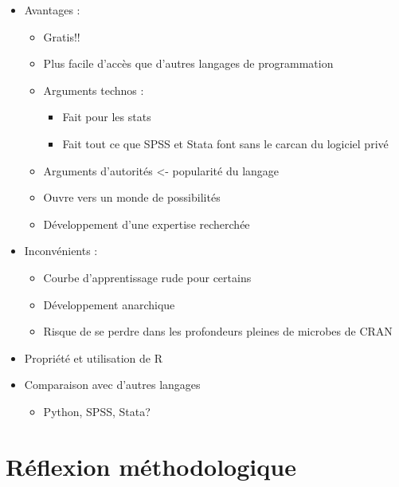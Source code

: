 \documentclass[
  letterpaper,
  DIV=11,
  numbers=noendperiod]{scrreprt}
\providecommand{\tightlist}{%
  \setlength{\itemsep}{0pt}\setlength{\parskip}{0pt}}\usepackage{longtable,booktabs,array}
\begin{document}
\begin{itemize}
\tightlist
\item
  Avantages :

  \begin{itemize}
  \tightlist
  \item
    Gratis!!
  \item
    Plus facile d'accès que d'autres langages de programmation
  \item
    Arguments technos :

    \begin{itemize}
    \tightlist
    \item
      Fait pour les stats
    \item
      Fait tout ce que SPSS et Stata font sans le carcan du logiciel
      privé
    \end{itemize}
  \item
    Arguments d'autorités \textless- popularité du langage
  \item
    Ouvre vers un monde de possibilités
  \item
    Développement d'une expertise recherchée
  \end{itemize}
\item
  Inconvénients :

  \begin{itemize}
  \tightlist
  \item
    Courbe d'apprentissage rude pour certains
  \item
    Développement anarchique
  \item
    Risque de se perdre dans les profondeurs pleines de microbes de CRAN
  \end{itemize}
\item
  Propriété et utilisation de R
\item
  Comparaison avec d'autres langages

  \begin{itemize}
  \tightlist
  \item
    Python, SPSS, Stata?
  \end{itemize}
\end{itemize}

\hypertarget{ruxe9flexion-muxe9thodologique}{%
\section{Réflexion
méthodologique}\label{ruxe9flexion-muxe9thodologique}}
\end{document}
